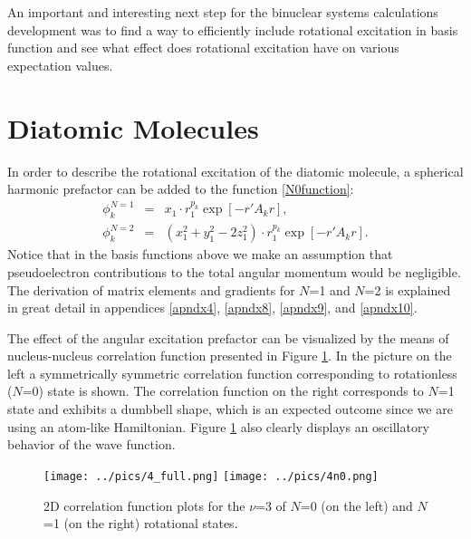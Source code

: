 An important and interesting next step for the binuclear systems calculations
development was to find a way to efficiently include rotational excitation
in basis function and see what effect does rotational excitation have on
various expectation values. 

\section{Diatomic Molecules}

In order to describe the rotational excitation of the diatomic molecule,
a spherical harmonic prefactor can be added to the function \ref{N0function}:
\begin{eqnarray}
\phi_k^{N=1} &=& x_1 \cdot r_1^{p_k} \exp [-r'A_k r], \\
\label{N1function}
\phi_k^{N=2} &=& (x_1^2 + y_1^2 - 2z_1^2) \cdot r_1^{p_k} \exp [-r'A_k r].
\label{N2function}
\end{eqnarray}
Notice that in the basis functions above we make an assumption that 
pseudoelectron contributions to the total angular momentum would be 
negligible. The derivation of matrix elements and gradients for $N$=1
and $N$=2 is explained in great detail in appendices 
\ref{apndx4}, \ref{apndx8}, \ref{apndx9}, and \ref{apndx10}.

The effect of the angular excitation prefactor can be visualized
by the means of nucleus-nucleus correlation function presented 
in Figure \ref{1d}. In the picture on the left a symmetrically
symmetric correlation function corresponding to rotationless ($N$=0)
state is shown. The correlation function on the right corresponds to 
$N$=1 state and exhibits a dumbbell shape, which is an expected outcome
since we are using an atom-like Hamiltonian. Figure \ref{1d} also 
clearly displays an oscillatory behavior of the wave function. 

\begin{figure}[t]
\begin{center}
\texttt{[image: ../pics/4\_full.png]}
\texttt{[image: ../pics/4n0.png]}
\end{center}
\caption{\label{1d}  2D correlation function plots for the 
$\nu$=3 of $N$=0 (on the left) and $N$=1 (on the right) rotational states.}
\end{figure}

